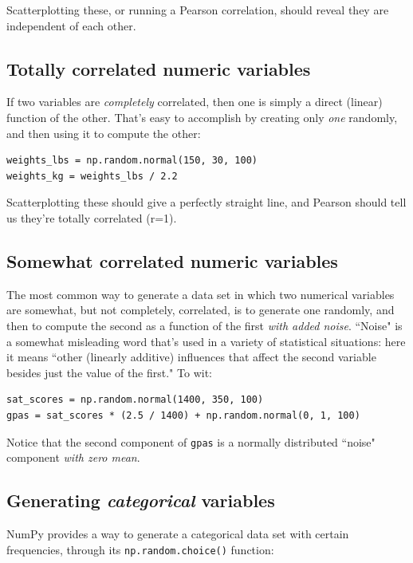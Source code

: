 \documentclass[12pt]{article}
\begin{document}
Scatterplotting these, or running a Pearson correlation, should reveal they
are independent of each other.

\subsection{Totally correlated numeric variables}

If two variables are \textit{completely} correlated, then one is simply a
direct (linear) function of the other. That's easy to accomplish by creating
only \textit{one} randomly, and then using it to compute the other:

\begin{Verbatim}[fontsize=small,samepage=true,frame=none]
weights_lbs = np.random.normal(150, 30, 100)
weights_kg = weights_lbs / 2.2
\end{Verbatim}

Scatterplotting these should give a perfectly straight line, and Pearson
should tell us they're totally correlated (r=1).

\subsection{Somewhat correlated numeric variables}

The most common way to generate a data set in which two numerical variables
are somewhat, but not completely, correlated, is to generate one randomly, and
then to compute the second as a function of the first \textit{with added
noise}. ``Noise" is a somewhat misleading word that's used in a variety of
statistical situations: here it means ``other (linearly additive) influences
that affect the second variable besides just the value of the first." To wit:

\begin{Verbatim}[fontsize=small,samepage=true,frame=none]
sat_scores = np.random.normal(1400, 350, 100)
gpas = sat_scores * (2.5 / 1400) + np.random.normal(0, 1, 100)
\end{Verbatim}

Notice that the second component of \texttt{gpas} is a normally distributed
``noise" component \textit{with zero mean}. 

\subsection{Generating \textit{categorical} variables}

NumPy provides a way to generate a categorical data set with certain
frequencies, through its \texttt{np.random.choice()} function:
\end{document}
